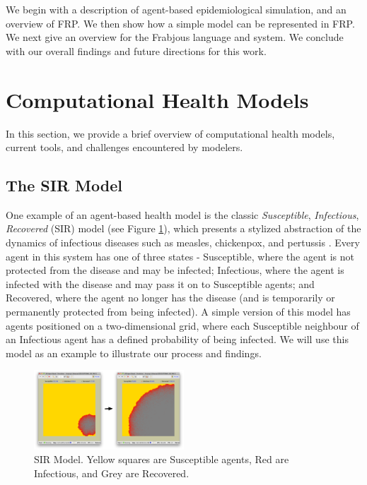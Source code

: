 \documentclass{sig-alternate}
\begin{document}
We begin with a description of agent-based epidemiological simulation, and an overview of FRP. We then show how a simple model can be represented in FRP. We next give an overview for the Frabjous language and system. We conclude with our overall findings and future directions for this work.


\section{Computational Health Models}

In this section, we provide a brief overview of computational health models, current tools, and challenges encountered by modelers.

\subsection{The SIR Model}

One example of an agent-based health model is the classic \emph{Susceptible}, \emph{Infectious}, \emph{Recovered} (SIR) model (see Figure \ref{fig:sir}), which presents a stylized abstraction of the dynamics of infectious diseases such as measles, chickenpox, and pertussis \cite{AZPH:AZPH56}. Every agent in this system has one of three states - Susceptible, where the agent is not protected from the disease and may be infected; Infectious, where the agent is infected with the disease and may pass it on to Susceptible agents; and Recovered, where the agent no longer has the disease (and is temporarily or permanently protected from being infected). A simple version of this model has agents positioned on a two-dimensional grid, where each Susceptible neighbour of an Infectious agent has a defined probability of being infected. We will use this model as an example to illustrate our process and findings.

\begin{figure}[h]
\includegraphics[width=0.5\textwidth]{sir.pdf}
\caption{SIR Model. Yellow squares are Susceptible agents, Red are Infectious, and Grey are Recovered. \label{fig:sir}}
\end{figure}
\end{document}
